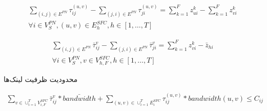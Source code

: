 \begin{latin}\begin{align}
	\sum_{(i,j) \in E^{PN}} \tau_{ij}^{(u,v)} - \sum_{(j,i) \in E^{PN}} \tau_{ji}^{(u,v)} = \sum_{k=1}^{F} z_{ui}^{k} - \sum_{k=1}^{F} z_{vi}^{k} \nonumber \\
	\forall i \in V_{S}^{PN}, (u,v) \in E_{h}^{SFC}, h \in [1,\ldots, T]
\end{align}\end{latin}
\begin{latin}\begin{align}
	\sum_{(i,j) \in E^{PN}} \bar{\tau}_{ij}^{v} - \sum_{(j,i) \in E^{PN}} \bar{\tau}_{ji}^{v} = \sum_{k=1}^{F} z_{vi}^{k} - \bar{z}_{hi} \nonumber \\
	\forall i \in V_{S}^{PN}, v \in V_{h, F}^{SFC}, h \in [1,\ldots, T]
\end{align}\end{latin}

محدودیت ظرفیت لینک‌ها
\begin{latin}\begin{align}
	\sum_{v \in \cup_{i=1}^{T} V_{i,F}^{SFC}} \bar{\tau}_{ij}^{v} * \bar{bandwidth} + \sum_{(u,v) \in \cup_{i=1}^{T} E_{i}^{SFC}} \tau_{ij}^{(u,v)} * bandwidth(u,v) \le C_{ij}
\end{align}\end{latin}